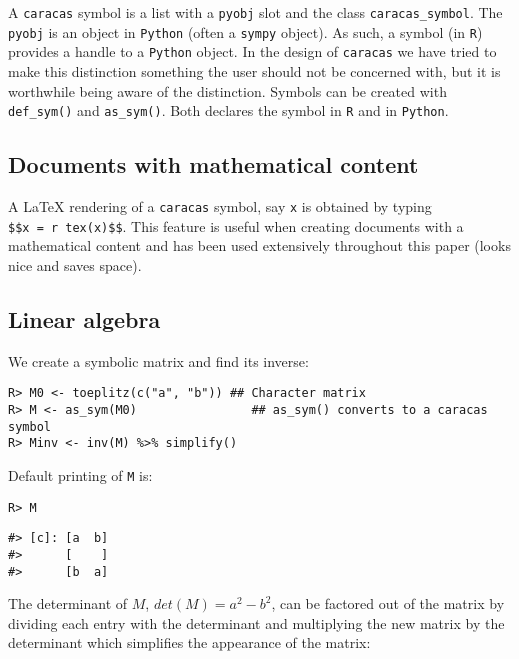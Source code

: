 A \texttt{caracas} symbol is a list with a \texttt{pyobj} slot and the class
\texttt{caracas\_symbol}. The \texttt{pyobj} is an object in \texttt{Python} (often a
\texttt{sympy} object). As such, a symbol (in \texttt{R}) provides a handle to a
\texttt{Python} object. In the design of \texttt{caracas} we have tried to make
this distinction something the user should not be concerned with, but
it is worthwhile being aware of the distinction.
Symbols can be created with \texttt{def\_sym()} and \texttt{as\_sym()}. Both declares
the symbol in \texttt{R} and in \texttt{Python}.

\hypertarget{documents-with-mathematical-content}{%
\subsection{Documents with mathematical content}\label{documents-with-mathematical-content}}

A LaTeX rendering of a \texttt{caracas} symbol, say \texttt{x} is obtained by typing
\texttt{\$\$x\ =\ \textasciigrave{}r\ tex(x)\textasciigrave{}\$\$}. This feature is useful when creating documents with a mathematical content and has been used extensively throughout this paper (looks nice and saves space).

\hypertarget{linear-algebra}{%
\subsection{Linear algebra}\label{linear-algebra}}

We create a symbolic matrix and find its inverse:

\begin{verbatim}
R> M0 <- toeplitz(c("a", "b")) ## Character matrix
R> M <- as_sym(M0)                ## as_sym() converts to a caracas symbol
R> Minv <- inv(M) %>% simplify()
\end{verbatim}

Default printing of \texttt{M} is:

\begin{verbatim}
R> M
\end{verbatim}

\begin{verbatim}
#> [c]: [a  b]
#>      [    ]
#>      [b  a]
\end{verbatim}

The determinant of \(M\), \(det(M)=a^2 - b^2\), can be factored out of
the matrix by dividing each entry with the determinant and multiplying
the new matrix by the determinant which simplifies the appearance of
the matrix:

